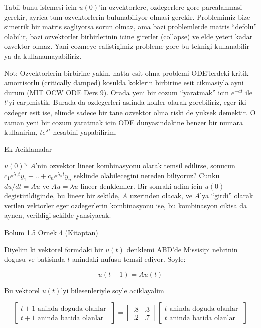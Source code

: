 \documentclass[12pt,fleqn]{article}
\begin{document}
Tabii bunu islemesi icin $u(0)$'in ozvektorlere, ozdegerlere gore
parcalanmasi gerekir, ayrica tum ozvektorlerin bulunabiliyor olmasi
gerekir. Problemimiz bize simetrik bir matris sagliyorsa sorun olmaz, ama
bazi problemlerde matris ``defolu'' olabilir, bazi ozvektorler
birbirlerinin icine girerler (collapse) ve elde yeteri kadar ozvektor
olmaz. Yani cozmeye calistigimiz probleme gore bu teknigi kullanabilir ya
da kullanamayabiliriz. 

Not: Ozvektorlerin birbirine yakin, hatta esit olma problemi ODE'lerdeki
kritik amortisorlu (critically damped) kosulda koklerin birbirine esit
cikmasiyla ayni durum (MIT OCW ODE Ders 9). Orada yeni bir cozum
``yaratmak'' icin $e^{-at}$ ile $t$'yi carpmistik. Burada da ozdegerleri
aslinda kokler olarak gorebiliriz, eger iki ozdeger esit ise, elimde sadece
bir tane ozvektor olma riski de yuksek demektir. O zaman yeni bir cozum
yaratmak icin ODE dunyasindakine benzer bir numara kullanirim, $te^{\lambda
  t}$ 
hesabini yapabilirim. 

Ek Aciklamalar

$u(0)$'i $A$'nin ozvektor lineer kombinasyonu olarak temsil edilirse,
sonucun $c_1e^{\lambda_1t}y_1 + .. + c_ne^{\lambda_n t}y_n$ seklinde
olabilecegini nereden biliyoruz?  Cunku $du/dt = Au$ ve $Au = \lambda u$
lineer denklemler. Bir sonraki adim icin $u(0)$ degistirildiginde, bu
lineer bir sekilde, $A$ uzerinden olacak, ve $A$'ya ``girdi'' olarak
verilen vektorler eger ozdegerlerin kombinasyonu ise, bu kombinasyon cikisa
da aynen, verildigi sekilde yansiyacak.

Bolum 1.5 Ornek 4 (Kitaptan)

Diyelim ki vektorel formdaki bir $u(t)$ denklemi ABD'de Missisipi nehrinin
dogusu ve batisinda $t$ anindaki nufusu temsil ediyor. Soyle:

\[ u(t+1) = Au(t) \]

Bu vektorel $u(t)$'yi bilesenleriyle soyle aciklayalim

\[ 
\left[\begin{array}{r}
t+1 \textrm{ aninda doguda olanlar } \\
t+1 \textrm{ aninda batida olanlar } 
\end{array}\right]
=
\left[\begin{array}{rr}
.8 & .3 \\
.2 & .7
\end{array}\right]
\left[\begin{array}{r}
t \textrm{ aninda doguda olanlar } \\
t \textrm{ aninda batida olanlar } 
\end{array}\right]
 \]
\end{document}
